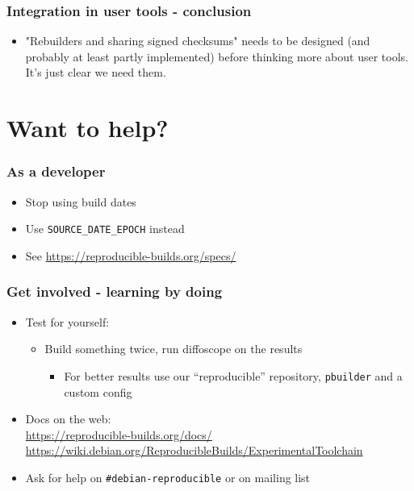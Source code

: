 \documentclass[14pt]{beamer}
\begin{document}
\begin{frame}
 \frametitle{Integration in user tools - conclusion}
 \begin{itemize}
  \item "Rebuilders and sharing signed checksums" needs to be designed
  (and probably at least partly implemented) before thinking more about
  user tools. It's just clear we need them. 
 \end{itemize}
\end{frame}

\section{Want to help?}

\begin{frame}
 \frametitle{As a developer}
 \begin{itemize}
  \item Stop using build dates
  \item Use \texttt{SOURCE\_DATE\_EPOCH} instead
  \item See \url{https://reproducible-builds.org/specs/}
 \end{itemize}
\end{frame}

\begin{frame}
 \frametitle{Get involved - learning by doing}

 \begin{itemize}
  \item Test for yourself:
   \begin{itemize}
    \item Build something twice, run diffoscope on the results
    \begin{itemize}
     \item For better results use our “reproducible” repository, \texttt{pbuilder} and a custom config
    \end{itemize}
   \end{itemize}
  \item Docs on the web: \\
    \small{\url{https://reproducible-builds.org/docs/}} \\
    \small{\url{https://wiki.debian.org/ReproducibleBuilds/ExperimentalToolchain}}
  \item Ask for help on \texttt{\#debian-reproducible} or on mailing list
 \end{itemize}
\end{frame}
\end{document}

